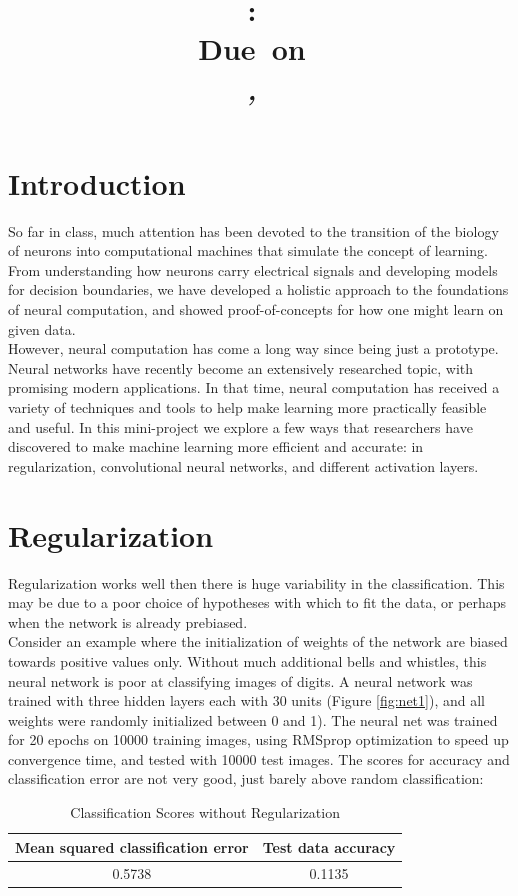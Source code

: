 \documentclass{article}
\title{
    \vspace{2in}
    \textmd{\textbf{\hmwkClass:\ \hmwkTitle}}\\
    \normalsize\vspace{0.1in}\small{Due\ on\ \hmwkDueDate}\\
    \vspace{0.1in}\large{\textit{\hmwkClassInstructor,\ \hmwkClassTime}}
    \vspace{3in}
}
\author{\textbf{\hmwkAuthorName} }
\date{}
\begin{document}
\maketitle

\pagebreak

\section{Introduction}
So far in class, much attention has been devoted to the transition of the biology of neurons into computational machines that simulate the concept of learning. From understanding how neurons carry electrical signals and developing models for decision boundaries, we have developed a holistic approach to the foundations of neural computation, and showed proof-of-concepts for how one might learn on given data. \\
However, neural computation has come a long way since being just a prototype. Neural networks have recently become an extensively researched topic, with promising modern applications. In that time, neural computation has received a variety of techniques and tools to help make learning more practically feasible and useful. In this mini-project we explore a few ways that researchers have discovered to make machine learning more efficient and accurate: in regularization, convolutional neural networks, and different activation layers. 

\section{Regularization}
Regularization works well then there is huge variability in the classification. This may be due to a poor choice of hypotheses with which to fit the data, or perhaps when the network is already prebiased. \\
Consider an example where the initialization of weights of the network are biased towards positive values only.
Without much additional bells and whistles, this neural network is poor at classifying images of digits. A neural network was trained with three hidden layers each with 30 units (Figure \ref{fig:net1}), and all weights were randomly initialized between 0 and 1). The neural net was trained for 20 epochs on 10000 training images, using RMSprop optimization to speed up convergence time, and tested with 10000 test images. The scores for accuracy and classification error are not very good, just barely above random classification:
\begin{table}[H]
    \caption{Classification Scores without Regularization}
    \centering

    \begin{tabular}{|c|c|}
    \hline

    \hline
    \textbf{Mean squared classification error } & \textbf{Test data accuracy} \\
    \hline
        0.5738 &  0.1135 \\
    \hline
    \end{tabular}
\end{table}
\end{document}
